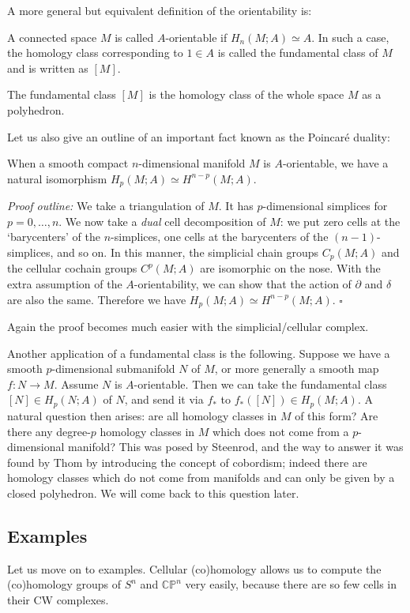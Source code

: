 \documentclass[12pt]{article}
\numberwithin{equation}{section}
\theoremstyle{remark}
\renewenvironment{proof}{\noindent\textsl{Proof outline:}}{\hfill$\square$}
\def\CP{\mathbb{CP}}
\begin{document}
A more general but equivalent definition of the orientability is:
\begin{definition}
  A connected space $M$ is called $A$-orientable if $H_n(M;A)\simeq A$.
  In such a case, the homology class  corresponding to $1\in A$ 
  is called the fundamental class of $M$ and is written as $[M]$.
\end{definition}
The fundamental class $[M]$ is the homology class of the whole space $M$
as a polyhedron.

Let us also give an outline of an important fact known as the Poincar\'e duality:
\begin{theorem}
  When a smooth compact $n$-dimensional manifold $M$ is $A$-orientable,
  we have a natural isomorphism $H_p(M;A)\simeq H^{n-p}(M;A)$.
\end{theorem}

  
\begin{proof}
  We take a triangulation of $M$.
  It has $p$-dimensional simplices for $p=0,\ldots,n$.
  We now take a \emph{dual} cell decomposition of $M$:
  we put zero cells at the `barycenters' of the $n$-simplices,
  one cells at the barycenters of the $(n-1)$-simplices, and so on.
  In this manner, the simplicial chain groups $C_p(M;A)$ 
  and the cellular cochain groups $C^p(M;A)$ are isomorphic on the nose.
  With the extra assumption of the $A$-orientability,
  we can show that the action of $\partial$ and $\delta$ are also the same.
  Therefore we have $H_p(M;A)\simeq H^{n-p}(M;A)$.
\end{proof}

Again the proof becomes much easier with the simplicial/cellular complex.

Another application of a fundamental class is the following.
Suppose we have a smooth $p$-dimensional submanifold $N$ of $M$,
or more generally a smooth map $f:N\to M$.
Assume $N$ is $A$-orientable.
Then we can take the fundamental class $[N]\in H_p(N;A)$ of $N$,
and send it via $f_*$ to $f_*([N])\in H_p(M;A)$.
A natural question then arises: are all homology classes in $M$ of this form?
Are there any degree-$p$ homology classes in $M$ which does not come 
from a $p$-dimensional manifold?
This was posed by Steenrod, and the way to answer it was found by Thom
by introducing the concept of cobordism;
indeed there are homology classes which do not come from manifolds
and can only be given by a closed polyhedron.
We will come back to this question later.

\subsection{Examples}
Let us move on to examples. 
Cellular (co)homology allows us to compute the (co)homology groups of $S^n$ and $\CP^n$ very easily, 
because there are so few cells in their CW complexes.
\end{document}
